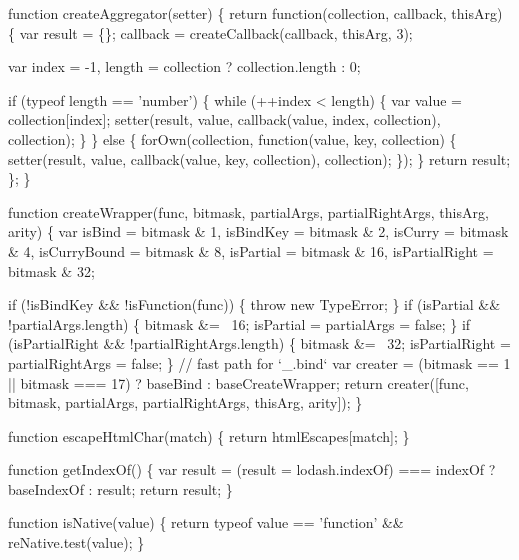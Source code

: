 \begin{DoxyCodeInclude}
{{  \textcolor{keyword}{function} createAggregator(setter) \{
    \textcolor{keywordflow}{return} \textcolor{keyword}{function}(collection, callback, thisArg) \{
      var result = \{\};
      callback = createCallback(callback, thisArg, 3);

      var index = -1,
          length = collection ? collection.length : 0;

      \textcolor{keywordflow}{if} (typeof length == \textcolor{stringliteral}{'number'}) \{
        \textcolor{keywordflow}{while} (++index < length) \{
          var value = collection[index];
          setter(result, value, callback(value, index, collection), collection);
        \}
      \} \textcolor{keywordflow}{else} \{
        forOwn(collection, \textcolor{keyword}{function}(value, key, collection) \{
          setter(result, value, callback(value, key, collection), collection);
        \});
      \}
      \textcolor{keywordflow}{return} result;
    \};
  \}

  \textcolor{keyword}{function} createWrapper(func, bitmask, partialArgs, partialRightArgs, thisArg, arity) \{
    var isBind = bitmask & 1,
        isBindKey = bitmask & 2,
        isCurry = bitmask & 4,
        isCurryBound = bitmask & 8,
        isPartial = bitmask & 16,
        isPartialRight = bitmask & 32;

    \textcolor{keywordflow}{if} (!isBindKey && !isFunction(func)) \{
      \textcolor{keywordflow}{throw} \textcolor{keyword}{new} TypeError;
    \}
    \textcolor{keywordflow}{if} (isPartial && !partialArgs.length) \{
      bitmask &= ~16;
      isPartial = partialArgs = \textcolor{keyword}{false};
    \}
    \textcolor{keywordflow}{if} (isPartialRight && !partialRightArgs.length) \{
      bitmask &= ~32;
      isPartialRight = partialRightArgs = \textcolor{keyword}{false};
    \}
    \textcolor{comment}{// fast path for `\_.bind`}
    var creater = (bitmask == 1 || bitmask === 17) ? baseBind : baseCreateWrapper;
    \textcolor{keywordflow}{return} creater([func, bitmask, partialArgs, partialRightArgs, thisArg, arity]);
  \}

  \textcolor{keyword}{function} escapeHtmlChar(match) \{
    \textcolor{keywordflow}{return} htmlEscapes[match];
  \}

  \textcolor{keyword}{function} getIndexOf() \{
    var result = (result = lodash.indexOf) === indexOf ? baseIndexOf : result;
    \textcolor{keywordflow}{return} result;
  \}

  \textcolor{keyword}{function} isNative(value) \{
    \textcolor{keywordflow}{return} typeof value == \textcolor{stringliteral}{'function'} && reNative.test(value);
  \}

}}
\end{DoxyCodeInclude}
